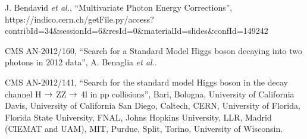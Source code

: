 \clearpage

\vspace*{-0.2cm}

J. Bendavid \textit{et al.}, ``Multivariate Photon Energy Corrections'',
https://indico.cern.ch/getFile.py/access?contribId=34\&sessionId=6\&resId=0\&materialId=slides\&confId=149242
 
 CMS AN-2012/160, ``Search for a Standard Model Higgs boson decaying into two photons in 2012 data'',
A. Benaglia  \textit{et al.}.

CMS AN-2012/141, ``Search for the standard model Higgs boson in the decay channel H $\rightarrow$ ZZ $\rightarrow$ 4l in pp collisions'', 
Bari, Bologna, University of California Davis, University of California San Diego, Caltech,
CERN, University of Florida, Florida State University, FNAL, Johns Hopkins University, LLR,
Madrid (CIEMAT and UAM), MIT, Purdue, Split, Torino, University of Wisconsin.

